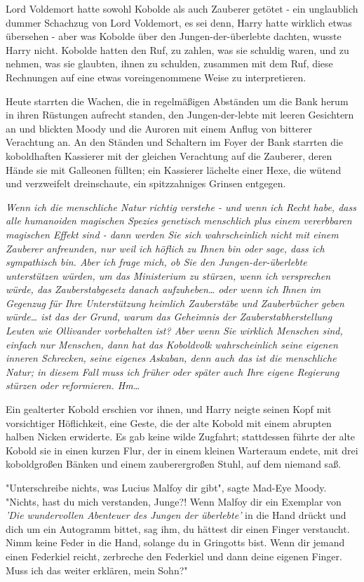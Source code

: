 {Lord Voldemort hatte sowohl Kobolde als auch Zauberer getötet - ein unglaublich dummer Schachzug von Lord Voldemort, es sei denn, Harry hatte wirklich etwas übersehen - aber was Kobolde über den Jungen-der-überlebte dachten, wusste Harry nicht. Kobolde hatten den Ruf, zu zahlen, was sie schuldig waren, und zu nehmen, was sie glaubten, ihnen zu schulden, zusammen mit dem Ruf, diese Rechnungen auf eine etwas voreingenommene Weise zu interpretieren.

Heute starrten die Wachen, die in regelmäßigen Abständen um die Bank herum in ihren Rüstungen aufrecht standen, den Jungen-der-lebte mit leeren Gesichtern an und blickten Moody und die Auroren mit einem Anflug von bitterer Verachtung an. An den Ständen und Schaltern im Foyer der Bank starrten die koboldhaften Kassierer mit der gleichen Verachtung auf die Zauberer, deren Hände sie mit Galleonen füllten; ein Kassierer lächelte einer Hexe, die wütend und verzweifelt dreinschaute, ein spitzzahniges Grinsen entgegen.

\emph{Wenn ich die menschliche Natur richtig verstehe - und wenn ich Recht habe, dass alle humanoiden magischen Spezies genetisch menschlich plus einem vererbbaren magischen Effekt sind - dann werden Sie sich wahrscheinlich nicht mit einem Zauberer anfreunden, nur weil ich höflich zu Ihnen bin oder sage, dass ich sympathisch bin. Aber ich frage mich, ob Sie den Jungen-der-überlebte unterstützen würden, um das Ministerium zu stürzen, wenn ich versprechen würde, das Zauberstabgesetz danach aufzuheben… oder wenn ich Ihnen im Gegenzug für Ihre Unterstützung heimlich Zauberstäbe und Zauberbücher geben würde… ist das der Grund, warum das Geheimnis der Zauberstabherstellung Leuten wie Ollivander vorbehalten ist? Aber wenn Sie wirklich Menschen sind, einfach nur Menschen, dann hat das Koboldvolk wahrscheinlich seine eigenen inneren Schrecken, seine eigenes Askaban, denn auch das ist die menschliche Natur; in diesem Fall muss ich früher oder später auch Ihre eigene Regierung stürzen oder reformieren. Hm…}

Ein gealterter Kobold erschien vor ihnen, und Harry neigte seinen Kopf mit vorsichtiger Höflichkeit, eine Geste, die der alte Kobold mit einem abrupten halben Nicken erwiderte. Es gab keine wilde Zugfahrt; stattdessen führte der alte Kobold sie in einen kurzen Flur, der in einem kleinen Warteraum endete, mit drei koboldgroßen Bänken und einem zauberergroßen Stuhl, auf dem niemand saß.

"Unterschreibe nichts, was Lucius Malfoy dir gibt", sagte Mad-Eye Moody. "Nichts, hast du mich verstanden, Junge?! Wenn Malfoy dir ein Exemplar von \emph{'Die wundervollen Abenteuer des Jungen der überlebte'} in die Hand drückt und dich um ein Autogramm bittet, sag ihm, du hättest dir einen Finger verstaucht. Nimm keine Feder in die Hand, solange du in Gringotts bist. Wenn dir jemand einen Federkiel reicht, zerbreche den Federkiel und dann deine eigenen Finger. Muss ich das weiter erklären, mein Sohn?"

}
